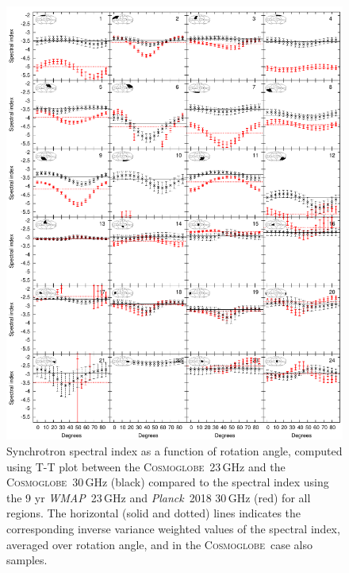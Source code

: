 \documentclass[twocolumn]{../../common/aa}
\def\WMAP{\emph{WMAP}}
\def\Planck{\emph{Planck}}
\newcommand{\Cosmoglobe}{\textsc{Cosmoglobe}}
\begin{document}
\begin{appendix}
\begin{figure}
        \centering
        \includegraphics[width=0.9\linewidth]{figures/cos30_ut_big_multialphaplot_converted.pdf}
        \caption{Synchrotron spectral index as a function of rotation angle, computed using T-T plot between the \Cosmoglobe\ 23\,GHz and the \Cosmoglobe\ 30\,GHz (black) compared to the spectral index using the 9 yr \WMAP\ 23\,GHz and \Planck\ 2018 30\,GHz (red) for all regions. The horizontal (solid and dotted) lines indicates the corresponding inverse variance weighted values of the spectral index, averaged over rotation angle, and in the \Cosmoglobe\ case also samples.}
        \label{fig:cos30_beta_bigalpha}
\end{figure}

\end{appendix}
\end{document}
